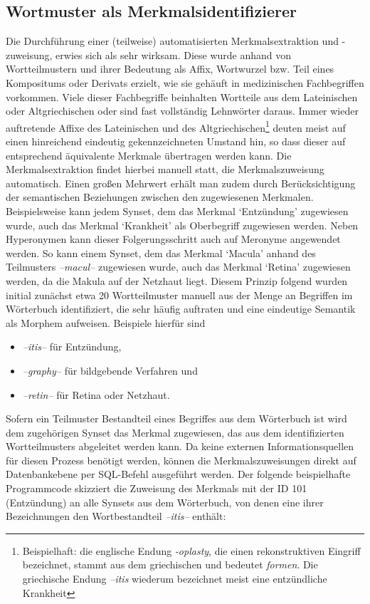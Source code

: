 \documentclass[pagesize,DIV=calc,12pt,draft]{scrreprt}
\begin{document}
\subsection{Wortmuster als Merkmalsidentifizierer}

Die Durchführung einer (teilweise) automatisierten Merkmalsextraktion und -zuweisung, erwies sich als sehr wirksam. 
Diese wurde anhand von Wortteilmustern und ihrer Bedeutung als Affix, Wortwurzel bzw. 
Teil eines Kompositums oder Derivats erzielt, wie sie gehäuft in medizinischen Fachbegriffen vorkommen. 
Viele dieser Fachbegriffe beinhalten Wortteile aus dem Lateinischen oder Altgriechischen oder sind fast vollständig Lehnwörter daraus. 
Immer wieder auftretende Affixe des Lateinischen und des Altgriechischen\footnote{Beispielhaft: die englische Endung \emph{-oplasty}, die einen rekonstruktiven Eingriff bezeichnet, stammt aus dem griechischen und bedeutet \emph{formen}. 
Die griechische Endung \emph{--itis} wiederum bezeichnet meist eine entzündliche Krankheit} deuten meist auf einen hinreichend eindeutig gekennzeichneten Umstand hin, so dass dieser auf entsprechend äquivalente Merkmale übertragen werden kann. 
Die Merkmalsextraktion findet hierbei manuell statt, die Merkmalszuweisung automatisch. 
Einen großen Mehrwert erhält man zudem durch Berücksichtigung der semantischen Beziehungen zwischen den zugewiesenen Merkmalen. 
Beispielsweise kann jedem Synset, dem das Merkmal `Entzündung' zugewiesen wurde, auch das Merkmal `Krankheit' als Oberbegriff zugewiesen werden. 
Neben Hyperonymen kann dieser Folgerungsschritt auch auf Meronyme angewendet werden. 
So kann einem Synset, dem das Merkmal `Macula' anhand des Teilmusters \emph{--macul--} zugewiesen wurde, auch das Merkmal `Retina' zugewiesen werden, da die Makula auf der Netzhaut liegt. 
Diesem Prinzip folgend wurden initial zunächst etwa 20 Wortteilmuster manuell aus der Menge an Begriffen im Wörterbuch identifiziert, die sehr häufig auftraten und eine eindeutige Semantik als Morphem aufweisen. 
Beispiele hierfür sind 

\begin{itemize}
\item
  \emph{--itis--} für Entzündung,
\item
  \emph{--graphy--} für bildgebende Verfahren und
\item
  \emph{--retin--} für Retina oder Netzhaut.
\end{itemize}

Sofern ein Teilmuster Bestandteil eines Begriffes aus dem Wörterbuch ist wird dem zugehörigen Synset das Merkmal zugewiesen, das aus dem identifizierten Wortteilmusters abgeleitet werden kann. 
Da keine externen Informationsquellen für diesen Prozess benötigt werden, können die Merkmalszuweisungen direkt auf Datenbankebene per SQL-Befehl ausgeführt werden. 
Der folgende beispielhafte Programmcode skizziert die Zuweisung des Merkmals mit der ID 101 (Entzündung) an alle Synsets aus dem Wörterbuch, von denen eine ihrer Bezeichnungen den Wortbestandteil \emph{--itis--} enthält: 
\end{document}
